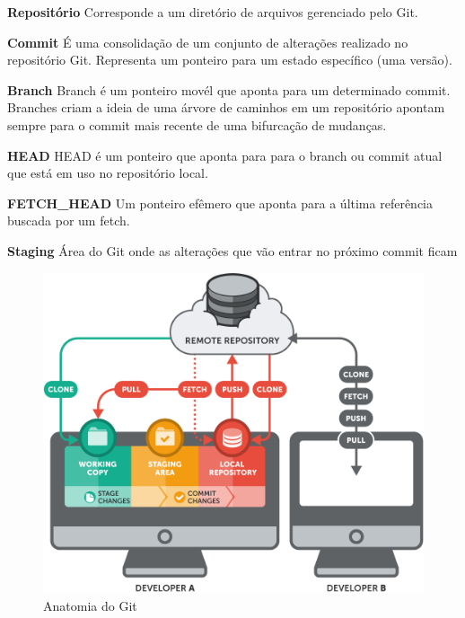 	\textbf{Repositório}
	\newline
	Corresponde a um diretório de arquivos gerenciado pelo Git.
	
	\textbf{Commit}
	\newline
	É uma consolidação de um conjunto de alterações realizado no repositório Git. Representa um ponteiro para um estado específico (uma versão).
	
	\textbf{Branch}
	\newline
	Branch é um ponteiro movél que aponta para um determinado commit. Branches criam a ideia de uma árvore de caminhos em um repositório apontam sempre para o commit mais recente de uma bifurcação de mudanças.
	
	\textbf{HEAD}
	\newline
	HEAD é um ponteiro que aponta para para o branch ou commit atual que está em uso no repositório local.
	
	\textbf{FETCH\_HEAD}
	\newline
	Um ponteiro efêmero que aponta para a última referência buscada por um fetch.
	
	\textbf{Staging}
	\newline
	Área do Git onde as alterações que vão entrar no próximo commit ficam
	
	\begin{figure}[htbp]
		\caption{\label{fig_git1}Anatomia do Git}
		\begin{center}
		\includegraphics[scale=0.4]{pictures/git.png}
		\end{center}
	\end{figure}
	
